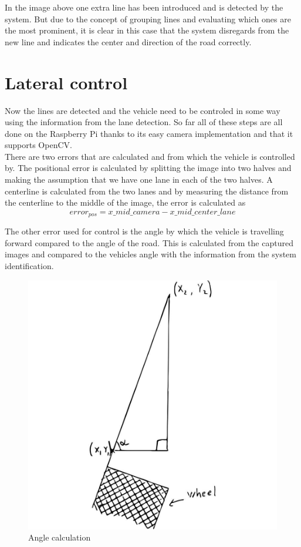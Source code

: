 In the image above one extra line has been introduced and is detected by the system. But due to the concept of grouping lines and evaluating which ones are the most prominent, it is clear in this case that the system disregards from the new line and indicates the center and direction of the road correctly. 



\section{Lateral control}
Now the lines are detected and the vehicle need to be controled in some way using the information from the lane detection. So far all of these steps are all done on the Raspberry Pi thanks to its easy camera implementation and that it supports OpenCV.\\

There are two errors that are calculated and from which the vehicle is controlled by. The positional error is calculated by splitting the image into two halves and making the assumption that we have one lane in each of the two halves. A centerline is calculated from the two lanes and by measuring the distance from the centerline to the middle of the image, the error is calculated as $$error_{pos} = x\_mid\_camera - x\_mid\_center\_lane$$

The other error used for control is the angle by which the vehicle is travelling forward compared to the angle of the road. This is calculated from the captured images and compared to the vehicles angle with the information from the system identification.\\

\begin{figure}[H]
  \includegraphics[scale=0.25]{./img/angle.JPG}
  \centering
  \caption{Angle calculation}
  \label{fig:angle}
\end{figure}


